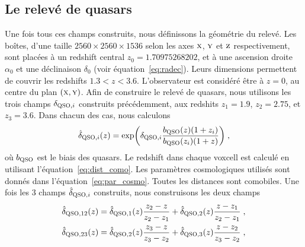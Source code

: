\documentclass[11pt, twoside, a4paper, openright]{report}
\begin{document}
\subsection{Le relevé de quasars}
\label{subsec:qso}
Une fois tous ces champs construits, nous définissons la géométrie du relevé. Les boîtes, d'une taille $\num{2560}\times\num{2560}\times\num{1536}$ selon les axes $\textsc{x}$, $\textsc{y}$ et $\textsc{z}$ respectivement, sont placées à un redshift central $z_0 = 1.70975268202$, et à une ascension droite $\alpha_0$ et une déclinaison $\delta_0$ (voir équation~\ref{eq:radec}). Leurs dimensions permettent de couvrir les redshifts $1.3 < z < 3.6$. L'observateur est considéré être à $z=0$, au centre du plan $(\textsc{x},\textsc{y})$.
Afin de construire le relevé de quasars, nous utilisons les trois champs $\delta_{\textsc{QSO}, i}$ construits précédemment, aux redshits $z_1 = \num{1.9}$, $z_2 = \num{2.75}$, et $z_3 = \num{3.6}$. Dans chacun des cas, nous calculons
\begin{equation}
  \hat \delta_{\textsc{QSO}, i}(z) = \exp(\delta_{\textsc{QSO},i} \frac{b_{\textsc{QSO}}(z) (1+z_i)}{b_{\textsc{QSO}}(z_i)(1+z)}) \; ,
\end{equation}
où $b_{\textsc{QSO}}$ est le biais des quasars. Le redshift dans chaque voxcell est calculé en utilisant l'équation~\ref{eq:dist_como}. Les paramètres cosmologiques utilisés sont donnés dans l'équation~\ref{eq:par_cosmo}. Toutes les distances sont comobiles.
Une fois les 3 champs $\hat \delta_{\textsc{QSO}, i}$ construits, nous construisons les deux champs
\begin{align}
  \hat \delta_{\textsc{QSO}, 12}(z) &= \hat \delta_{\textsc{QSO}, 1}(z) \frac{z_2 - z}{z_2 - z_1} + \hat \delta_{\textsc{QSO}, 2}(z) \frac{z - z_1}{z_2 - z_1} \; ,\\
  \hat \delta_{\textsc{QSO}, 23}(z) &= \hat \delta_{\textsc{QSO}, 2}(z) \frac{z_3 - z}{z_3 - z_2} + \hat \delta_{\textsc{QSO}, 3}(z) \frac{z - z_2}{z_3 - z_2} \; ,
\end{align}
\end{document}
